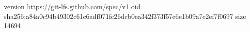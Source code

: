 version https://git-lfs.github.com/spec/v1
oid sha256:a84a0c94b49302c61c6adf071fc26dcb0ea342f373f57e6e1b09a7e2ef7f0697
size 14694
